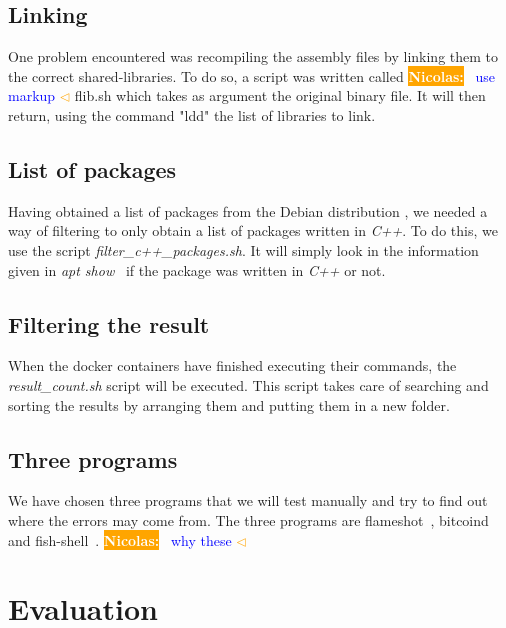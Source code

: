 \documentclass[a4paper,11pt,oneside]{report}
\newcommand{\todobox}[3]{%
	\colorbox{#1}{\textcolor{white}{\sffamily\bfseries\scriptsize #2}}%
	~\textcolor{blue}{#3} %
	\textcolor{#1}{$\triangleleft$}%
}
\newcommand{\nb}[1]{\todobox{orange}{Nicolas:}{#1}}
\begin{document}
\section{Linking}
One problem encountered was recompiling the
assembly files by linking them to the correct shared-libraries. To do so, a 
script was written called \nb{use markup} flib.sh which takes as argument the original binary
file. It will then return, using the command "ldd"\cite{ldd} the list of
libraries to link. 

\section{List of packages}

Having obtained a list of packages from the Debian distribution
\cite{sourcePackage}, we needed a way of filtering to only obtain
a list of packages written in \textit{C++}. To do this, we use the script
\textit{filter\_c++\_packages.sh}. It will simply look in the information given
in \textit{apt show}~\cite{apt} if the package was written in \textit{C++} or
not. 

\section{Filtering the result}
When the docker containers have finished executing their commands, the
\textit{result\_count.sh} script will be executed. This script takes care of searching
and sorting the results by arranging them and putting them in a new folder.

\section{Three programs}
We have chosen three programs that we will test manually and try to find out
where the errors may come from. The three programs are
flameshot~\cite{flameshot}, bitcoind~\cite{bitcoind} and
fish-shell~\cite{fish}.\nb{why these}


\chapter{Evaluation}



%
\end{document}
